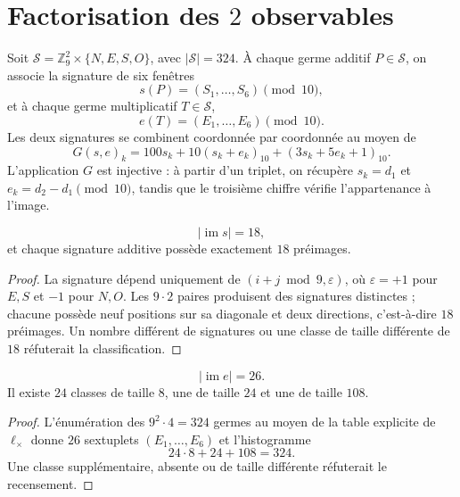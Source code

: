 \section{Factorisation des \(2\) observables}

Soit \(\mathcal S=\mathbb Z_9^2\times\{N,E,S,O\}\), avec
\(|\mathcal S|=324\). À chaque germe additif \(P\in\mathcal S\), on
associe la signature de six fenêtres
\[
s(P)=(S_1,\ldots,S_6)\pmod{10},
\]
et à chaque germe multiplicatif \(T\in\mathcal S\),
\[
e(T)=(E_1,\ldots,E_6)\pmod{10}.
\]
Les deux signatures se combinent coordonnée par coordonnée au moyen de
\[
G(s,e)_k=
100s_k+10(s_k+e_k)_{10}+(3s_k+5e_k+1)_{10}.
\]
L'application \(G\) est injective : à partir d'un triplet, on récupère
\(s_k=d_1\) et \(e_k=d_2-d_1\pmod{10}\), tandis que le troisième chiffre vérifie
l'appartenance à l'image.

\begin{lemma}
\label{pf84:E02-18}
\[
 |\operatorname{im}s|=18,
\]
et chaque signature additive possède exactement \(18\) préimages.
\end{lemma}
\begin{proof}
La signature dépend uniquement de
\((i+j\bmod9,\varepsilon)\), où \(\varepsilon=+1\) pour \(E,S\) et
\(-1\) pour \(N,O\). Les \(9\cdot2\) paires produisent des signatures distinctes ; chacune
possède neuf positions sur sa diagonale et deux directions, c'est-à-dire
\(18\) préimages. Un nombre différent de signatures ou une classe de taille
différente de \(18\) réfuterait la classification.
\end{proof}

\begin{lemma}
\label{pf84:E02-19}
\[
 |\operatorname{im}e|=26.
\]
Il existe \(24\) classes de taille \(8\), une de taille \(24\) et une de taille
\(108\).
\end{lemma}
\begin{proof}
L'énumération des \(9^2\cdot4=324\) germes au moyen de la table explicite
de \(\ell_\times\) donne \(26\) sextuplets
\((E_1,\ldots,E_6)\) et l'histogramme
\[
 24\cdot8+24+108=324.
\]
Une classe supplémentaire, absente ou de taille différente réfuterait le recensement.
\end{proof}

